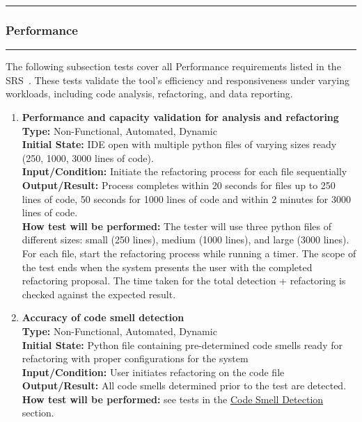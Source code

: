 \documentclass[12pt, titlepage]{article}
\newcommand{\colorrule}{\textcolor{BlueViolet}{\rule{\linewidth}{2pt}}}
\begin{document}
  \noindent
  \textcolor{Blue}{\colorrule}

  \subsubsection{Performance}
  \colorrule

  \medskip

  \noindent
  The following subsection tests cover all Performance requirements
  listed in the SRS~\cite{SRS}. These tests validate the tool’s
  efficiency and responsiveness under varying workloads, including
  code analysis, refactoring, and data reporting.

  \begin{enumerate}[label={\bf \textcolor{Maroon}{test-PF-\arabic*}},
      wide=0pt, font=\itshape]
    \item \textbf{Performance and capacity validation for analysis
      and refactoring} \\[2mm]
      \textbf{Type:} Non-Functional, Automated, Dynamic \\
      \textbf{Initial State:} IDE open with multiple python files of
      varying sizes ready (250, 1000, 3000 lines of code). \\
      \textbf{Input/Condition:} Initiate the refactoring process for
      each file sequentially \\
      \textbf{Output/Result:} Process completes within 20 seconds for
      files up to 250 lines of code, 50 seconds for 1000 lines of
      code and within 2 minutes for 3000 lines of code. \\[2mm]
      \textbf{How test will be performed:} The tester will use three
      python files of different sizes: small (250 lines), medium
      (1000 lines), and
      large (3000 lines). For each file, start the refactoring
      process while running a timer.
      The scope of the test ends when the system presents the user
      with the completed refactoring proposal.
      The time taken for the total detection + refactoring is checked
      against the expected result.

    \item \textbf{Accuracy of code smell detection} \\[2mm]
      \textbf{Type:} Non-Functional, Automated, Dynamic \\
      \textbf{Initial State:} Python file containing pre-determined
      code smells ready for refactoring with proper configurations
      for the system \\
      \textbf{Input/Condition:} User initiates refactoring on the code file \\
      \textbf{Output/Result:} All code smells determined prior to the
      test are detected. \\[2mm]
      \textbf{How test will be performed:} see tests in the
      \hyperref[4.1.2]{Code Smell Detection} section.


\end{enumerate}
\end{document}
